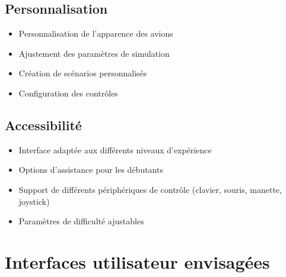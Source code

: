 \documentclass[12pt,a4paper]{article}
\begin{document}
\subsection{Personnalisation}
\begin{itemize}
    \item Personnalisation de l'apparence des avions
    \item Ajustement des paramètres de simulation
    \item Création de scénarios personnalisés
    \item Configuration des contrôles
\end{itemize}

\subsection{Accessibilité}
\begin{itemize}
    \item Interface adaptée aux différents niveaux d'expérience
    \item Options d'assistance pour les débutants
    \item Support de différents périphériques de contrôle (clavier, souris, manette, joystick)
    \item Paramètres de difficulté ajustables
\end{itemize}

\section{Interfaces utilisateur envisagées}
\begin{figure}[h]
    \centering
\end{figure}

\begin{figure}[h]
    \centering
\end{figure}
\end{document}
